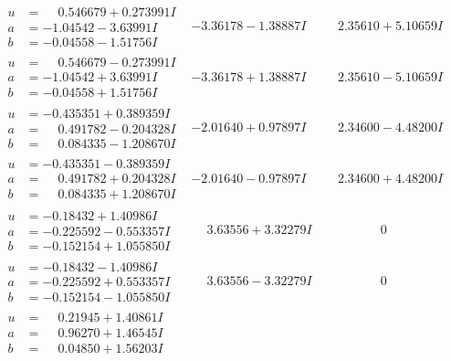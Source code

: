 \documentclass[1p]{elsarticle_modified}
\theoremstyle{definition}
\begin{document}
$$\begin{array}{c|c|c}
\begin{aligned}
u &= \phantom{-}0.546679 + 0.273991 I \\
a &= -1.04542 - 3.63991 I \\
b &= -0.04558 - 1.51756 I\end{aligned}
 & -3.36178 - 1.38887 I & \phantom{-}2.35610 + 5.10659 I \\ \hline\begin{aligned}
u &= \phantom{-}0.546679 - 0.273991 I \\
a &= -1.04542 + 3.63991 I \\
b &= -0.04558 + 1.51756 I\end{aligned}
 & -3.36178 + 1.38887 I & \phantom{-}2.35610 - 5.10659 I \\ \hline\begin{aligned}
u &= -0.435351 + 0.389359 I \\
a &= \phantom{-}0.491782 - 0.204328 I \\
b &= \phantom{-}0.084335 - 1.208670 I\end{aligned}
 & -2.01640 + 0.97897 I & \phantom{-}2.34600 - 4.48200 I \\ \hline\begin{aligned}
u &= -0.435351 - 0.389359 I \\
a &= \phantom{-}0.491782 + 0.204328 I \\
b &= \phantom{-}0.084335 + 1.208670 I\end{aligned}
 & -2.01640 - 0.97897 I & \phantom{-}2.34600 + 4.48200 I \\ \hline\begin{aligned}
u &= -0.18432 + 1.40986 I \\
a &= -0.225592 - 0.553357 I \\
b &= -0.152154 + 1.055850 I\end{aligned}
 & \phantom{-}3.63556 + 3.32279 I & \phantom{-0.000000 } 0 \\ \hline\begin{aligned}
u &= -0.18432 - 1.40986 I \\
a &= -0.225592 + 0.553357 I \\
b &= -0.152154 - 1.055850 I\end{aligned}
 & \phantom{-}3.63556 - 3.32279 I & \phantom{-0.000000 } 0 \\ \hline\begin{aligned}
u &= \phantom{-}0.21945 + 1.40861 I \\
a &= \phantom{-}0.96270 + 1.46545 I \\
b &= \phantom{-}0.04850 + 1.56203 I\end{aligned}

\end{array}$$
\end{document}
